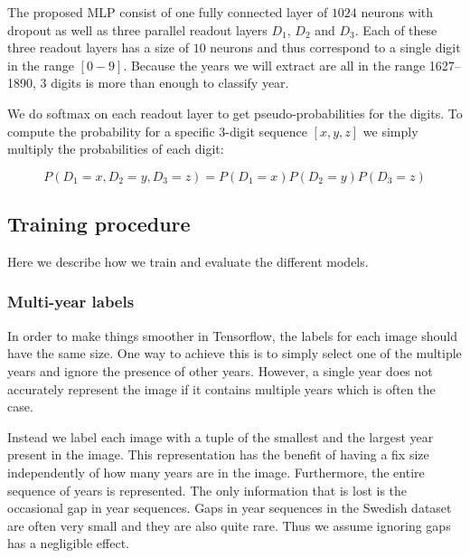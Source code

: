 The proposed MLP consist of one fully connected layer of $1024$ neurons with dropout as well as three parallel readout layers $D_1$, $D_2$ and $D_3$. Each of these three readout layers has a size of $10$ neurons and thus correspond to a single digit in the range $[0-9]$.
Because the years we will extract are all in the range 1627--1890, $3$ digits is more than enough to classify year.

We do softmax on each readout layer to get pseudo-probabilities for the digits.
To compute the probability for a specific 3-digit sequence $[x, y, z]$ we simply multiply the probabilities of each digit:

\[
P(D_1=x, D_2=y, D_3=z) = P(D_1=x) P(D_2=y) P(D_3=z)
\]


\subsection{Training procedure}

Here we describe how we train and evaluate the different models.

\subsubsection{Multi-year labels}

In order to make things smoother in Tensorflow, the labels for each image should have the same size. One way to achieve this is to simply select one of the multiple years and ignore the presence of other years. However, a single year does not accurately represent the image if it contains multiple years which is often the case.

Instead we label each image with a tuple of the smallest and the largest year present in the image. This representation has the benefit of having a fix size independently of how many years are in the image. Furthermore, the entire sequence of years is represented. The only information that is lost is the occasional gap in year sequences. Gaps in year sequences in the Swedish dataset are often very small and they are also quite rare. Thus we assume ignoring gaps has a negligible effect.




